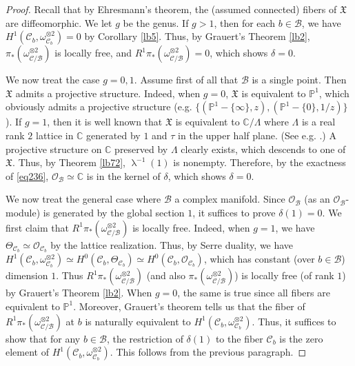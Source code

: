 \documentclass[12pt,b5paper,notitlepage]{report}
\theoremstyle{definition}
\theoremstyle{plain}
\newcommand{\fk}{\mathfrak}
\newcommand{\mc}{\mathcal}
\newcommand{\scr}{\mathscr}
\newcommand{\Cbb}{\mathbb C}
\newcommand{\Pbb}{\mathbb P}
\numberwithin{equation}{section}
\begin{document}
\begin{proof}
Recall that by Ehresmann's theorem, the (assumed connected) fibers of $\fk X$ are diffeomorphic. We let $g$ be the genus. If $g>1$, then for each $b\in\mc B$, we have $H^1(\mc C_b,\omega_{\mc C_b}^{\otimes 2})=0$ by Corollary \ref{lb5}. Thus, by Grauert's Theorem \ref{lb2}, $\pi_*(\omega_{\mc C/\mc B}^{\otimes 2})$ is locally free, and  $R^1\pi_*(\omega_{\mc C/\mc B}^{\otimes 2})=0$, which shows $\delta=0$.

We now treat the case $g=0,1$. Assume first of all that $\mc B$ is a single point. Then $\fk X$ admits a projective structure.  Indeed, when $g=0$, $\fk X$ is equivalent to $\Pbb^1$, which obviously admits a projective structure (e.g. $\{(\Pbb^1-\{\infty\},z),(\Pbb^1-\{0\},1/z)\}$). If $g=1$, then it is well known that $\fk X$ is equivalent to $\Cbb/\Lambda$ where $\Lambda$ is a real rank $2$ lattice in $\Cbb$ generated by $1$ and $\tau$ in the upper half plane. (See e.g. \cite{Hain08}.) A projective structure on $\Cbb$ preserved by $\Lambda$ clearly exists, which descends to one of $\fk X$. Thus, by Theorem \ref{lb72}, $\uplambda^{-1}(1)$ is nonempty. Therefore, by the exactness of \eqref{eq236}, $\scr O_{\mc B}\simeq \Cbb$ is in the kernel of $\delta$, which shows $\delta=0$.



We now treat the general case where $\mc B$ a complex manifold. Since $\scr O_{\mc B}$ (as an $\scr O_{\mc B}$-module) is generated by the global section $1$, it suffices to prove $\delta(1)=0$.  We first claim that $R^1\pi_*(\omega_{\mc C/\mc B}^{\otimes 2})$ is locally free. Indeed,  when $g=1$, we have $\Theta_{\mc C_b}\simeq\scr O_{\mc C_b}$ by the lattice realization. Thus, by Serre duality, we have $H^1(\mc C_b,\omega_{\mc C_b}^{\otimes 2})\simeq H^0(\mc C_b,\Theta_{\mc C_b})\simeq H^0(\mc C_b,\scr O_{\mc C_b})$, which has constant (over $b\in\mc B$) dimension $1$. Thus $R^1\pi_*(\omega_{\mc C/\mc B}^{\otimes 2})$ (and also $\pi_*(\omega_{\mc C/\mc B}^{\otimes 2})$) is locally free (of rank $1$) by Grauert's Theorem \ref{lb2}. When $g=0$, the same is true since all fibers are equivalent to $\Pbb^1$. Moreover, Grauert's theorem tells us that the fiber of $R^1\pi_*(\omega_{\mc C/\mc B}^{\otimes 2})$ at $b$ is naturally equivalent to $H^1(\mc C_b,\omega_{\mc C_b}^{\otimes 2})$. Thus, it suffices to show that for any $b\in\mc B$, the restriction of $\delta(1)$ to the fiber $\mc C_b$ is the zero element of $H^1(\mc C_b,\omega_{\mc C_b}^{\otimes 2})$. This follows from the previous paragraph.
\end{proof}
\end{document}
